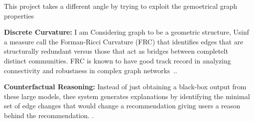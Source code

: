 This project takes a different angle by trying to exploit the gemoetrical graph properties

\textbf{Discrete Curvature:} I am Considering graph to be a geometric structure, Usinf a measure call the Forman-Ricci Curvature (FRC) that identifies edges that are structurally redundant versus those that act as bridges between completelt distinct communities. FRC is known to have good track record in analyzing connectivity and robustness in complex graph  networks~\cite{hashemi2024graph, emergentmind_forman}.\cite{fei2025efficient, fei2026dynamic}.

\textbf{Counterfactual Reasoning:} Instead of just obtaining a black-box output from these large models, thee system generates explanations by identifying the minimal set of edge changes that would change a recommendation giving users a reason behind the recommendation. \cite{PradoRomeroetal2023}.